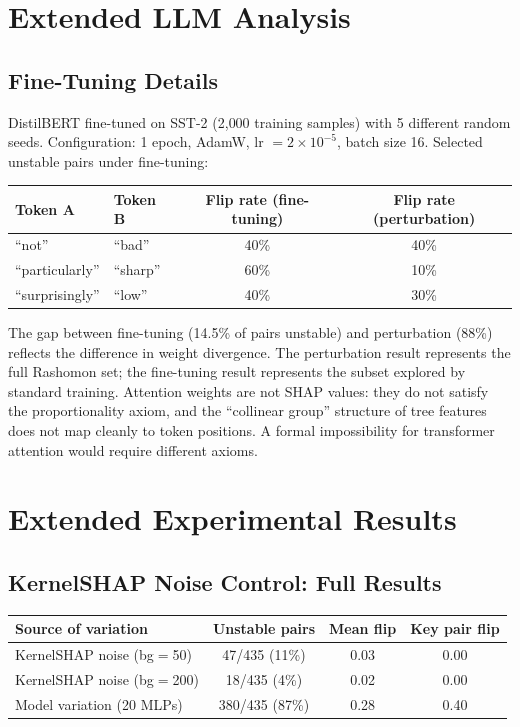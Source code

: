 \documentclass{article}
\begin{document}
\section{Extended LLM Analysis}

\subsection{Fine-Tuning Details}

DistilBERT fine-tuned on SST-2 (2{,}000 training samples) with 5 different random seeds. Configuration: 1 epoch, AdamW, lr $= 2 \times 10^{-5}$, batch size 16. Selected unstable pairs under fine-tuning:

\begin{center}
\small
\begin{tabular}{@{}llcc@{}}
\toprule
Token A & Token B & Flip rate (fine-tuning) & Flip rate (perturbation) \\
\midrule
``not'' & ``bad'' & 40\% & 40\% \\
``particularly'' & ``sharp'' & 60\% & 10\% \\
``surprisingly'' & ``low'' & 40\% & 30\% \\
\bottomrule
\end{tabular}
\end{center}

The gap between fine-tuning (14.5\% of pairs unstable) and perturbation (88\%) reflects the difference in weight divergence. The perturbation result represents the full Rashomon set; the fine-tuning result represents the subset explored by standard training. Attention weights are not SHAP values: they do not satisfy the proportionality axiom, and the ``collinear group'' structure of tree features does not map cleanly to token positions. A formal impossibility for transformer attention would require different axioms.

\section{Extended Experimental Results}
\label{sec:extended-experiments}

\subsection{KernelSHAP Noise Control: Full Results}

\begin{center}
\small
\begin{tabular}{@{}lccc@{}}
\toprule
Source of variation & Unstable pairs & Mean flip & Key pair flip \\
\midrule
KernelSHAP noise (bg$=$50) & 47/435 (11\%) & 0.03 & 0.00 \\
KernelSHAP noise (bg$=$200) & 18/435 (4\%) & 0.02 & 0.00 \\
Model variation (20 MLPs) & 380/435 (87\%) & 0.28 & 0.40 \\
\bottomrule
\end{tabular}
\end{center}
\end{document}
